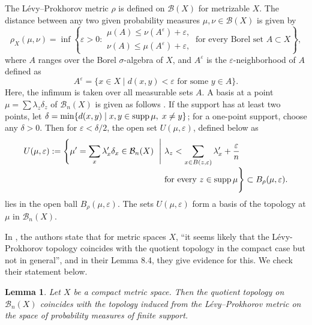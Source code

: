 \documentclass[11pt,a4paper]{article}
\numberwithin{equation}{section}
\newtheorem{lem}[thm]{Lemma}
\theoremstyle{definition}
\theoremstyle{remark}
\newcommand{\supp}{\operatorname{supp}}
\newcommand{\BB}{\mathcal B}
\begin{document}
The Lévy--Prokhorov metric $\rho$ is defined on $\BB(X)$ for metrizable $X$. The distance between any two given probability measures $\mu,\nu\in \BB(X)$ is given by
$$
\rho_X(\mu,\nu)
=
\inf\left\{
\varepsilon>0:
\begin{array}{l}
\mu(A)\leq \nu(A^\varepsilon)+\varepsilon,\\[1mm]
\nu(A)\leq \mu(A^\varepsilon)+\varepsilon,
\end{array}
\ \text{for every Borel set }A\subset X
\right\},
$$
where \(A\) ranges over the Borel \(\sigma\)-algebra of \(X\), and $A^{\varepsilon}$ is the $\varepsilon$-neighborhood of $A$ defined as 
$$A^{\varepsilon}=\{x\in X \mid d(x,y) < \varepsilon \text{ for some } y\in A\}.$$   
Here, the infimum is taken over all measurable sets $A$. 
A basis at a point $\mu=\sum\lambda_z\delta_z$ of $\BB_n(X)$ is given as follows \cite{DJ}. If the support has at least two points, let $\delta=\min\{d(x,y)\mid x,y\in \supp\mu, \hspace{1mm} x\ne y\}$; for a one-point support, choose any $\delta>0$. Then for $\varepsilon<\delta/2$, the open set $U(\mu,\varepsilon)$, defined below as 
\[
\begin{aligned}
U(\mu,\varepsilon):=\Biggl\{\mu'=\sum_x\lambda'_x\delta_x\in\BB_n(X)\ \Biggm|\ 
&\lambda_z<\sum_{x\in B(z,\varepsilon)}\lambda'_x+\frac{\varepsilon}{n}\\[-1mm]
&\text{for every }z\in\supp\mu\Biggr\}
\subset B_\rho(\mu,\varepsilon).
\end{aligned}
\]
lies in the open ball $B_\rho(\mu,\varepsilon)$. The sets $U(\mu,\varepsilon)$ form a basis of the topology at $\mu$ in $\BB_n(X)$.

In \cite{KW}, the authors state that for metric spaces $X$, ``it seems likely that the Lévy-Prokhorov topology coincides with the quotient topology in the compact case but not in general'', and in their Lemma 8.4, they give evidence for this.  We check their statement below.

\begin{lem}
Let \(X\) be a compact metric space. Then the quotient topology on
$\BB_n(X)$
coincides with the topology induced from the Lévy--Prokhorov metric on the space
of probability measures of finite support.
\end{lem}
\end{document}
